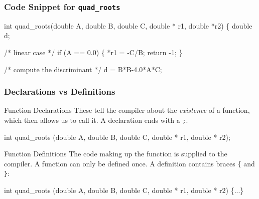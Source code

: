 \documentclass[table]{beamer}
\newif\ifschigh\schighfalse
\newcommand{\kw}[1]{\ifschigh\textcolor{red}{#1}\else\textcolor{keyword}{#1}\fi}
\newcommand{\kc}[1]{\ifschigh\textcolor{red}{#1}\else\textcolor{comment}{#1}\fi}
\begin{document}
\begin{frame}[fragile]
\frametitle{Code Snippet for {\tt quad\_roots}}
\begin{semiverbatim}
\kw{int} quad_roots(\kw{double} A, \kw{double} B, \kw{double} C,
               \kw{double} * r1, \kw{double} *r2)
\{
   \kw{double} d;
   
   \kc{/* linear case */}
   if (A == 0.0)
   \{
      *r1 = -C/B;
      \kw{return} -1;
   \}
          
   \kc{/* compute the discriminant */}
   d = B*B-4.0*A*C;
\end{semiverbatim}
\end{frame}

\begin{frame}[fragile]
\frametitle{Declarations vs Definitions}
\begin{block}{Function Declarations}
These tell the compiler about the \emph{existence} of a function, which then
allows us to call it. A declaration ends with a {\tt ;}.
\begin{semiverbatim}
\kw{int} quad_roots (\kw{double} A, \kw{double} B, \kw{double} C,
                \kw{double} * r1, \kw{double} * r2);
\end{semiverbatim}
\end{block}

\begin{block}{Function Definitions}
The code making up the function is supplied to the compiler. A function can only be defined once. A definition contains braces {\tt \{} and {\tt \}}:
\begin{semiverbatim}
\kw{int} quad_roots (\kw{double} A, \kw{double} B, \kw{double} C,
                \kw{double} * r1, \kw{double} * r2)
\{...\}
\end{semiverbatim}
\end{block}
\end{frame}
\end{document}
